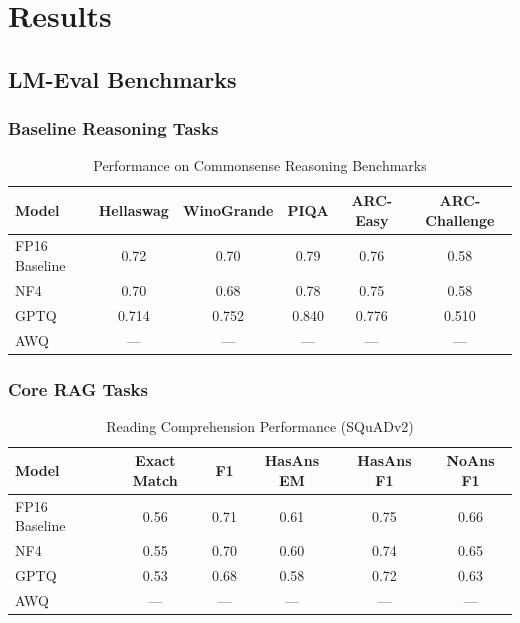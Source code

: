 \section{Results}

\subsection{LM-Eval Benchmarks}

\subsubsection{Baseline Reasoning Tasks}

\begin{table}[h]
\centering
\caption{Performance on Commonsense Reasoning Benchmarks}
\label{tab:baseline_reasoning}
\begin{tabular}{@{}lccccc@{}}
\toprule
\textbf{Model} & \textbf{Hellaswag} & \textbf{WinoGrande} & \textbf{PIQA} & \textbf{ARC-Easy} & \textbf{ARC-Challenge} \\
\midrule
FP16 Baseline & 0.72 & 0.70 & 0.79 & 0.76 & 0.58 \\
NF4 & 0.70 & 0.68 & 0.78 & 0.75 & 0.58 \\
GPTQ & 0.714 & 0.752 & 0.840 & 0.776 & 0.510 \\
AWQ & --- & --- & --- & --- & --- \\
\bottomrule
\end{tabular}
\end{table}

\subsubsection{Core RAG Tasks}

\begin{table}[h]
\centering
\caption{Reading Comprehension Performance (SQuADv2)}
\label{tab:core_rag}
\begin{tabular}{@{}lccccc@{}}
\toprule
\textbf{Model} & \textbf{Exact Match} & \textbf{F1} & \textbf{HasAns EM} & \textbf{HasAns F1} & \textbf{NoAns F1} \\
\midrule
FP16 Baseline & 0.56 & 0.71 & 0.61 & 0.75 & 0.66 \\
NF4 & 0.55 & 0.70 & 0.60 & 0.74 & 0.65 \\
GPTQ & 0.53 & 0.68 & 0.58 & 0.72 & 0.63 \\
AWQ & --- & --- & --- & --- & --- \\
\bottomrule
\end{tabular}
\end{table}

